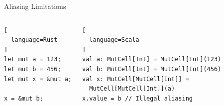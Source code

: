 \begin{frame}[fragile]{Aliasing Limitations}
\begin{columns}[T]
\begin{lstlisting}[
  language=Rust
]
let mut a = 123;
let mut b = 456;
let mut x = &mut a;

x = &mut b;
\end{lstlisting}

\begin{lstlisting}[
  language=Scala
]
val a: MutCell[Int] = MutCell[Int](123)
val b: MutCell[Int] = MutCell[Int](456)
val x: MutCell[MutCell[Int]] =
  MutCell[MutCell[Int]](a)
x.value = b // Illegal aliasing
\end{lstlisting}
\end{columns}
\end{frame}
